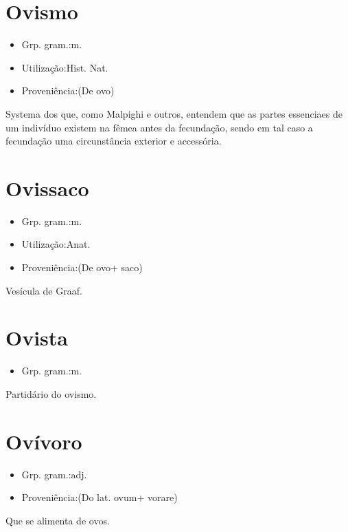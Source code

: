 \section{Ovismo}
\begin{itemize}
\item {Grp. gram.:m.}
\end{itemize}
\begin{itemize}
\item {Utilização:Hist. Nat.}
\end{itemize}
\begin{itemize}
\item {Proveniência:(De \textunderscore ovo\textunderscore )}
\end{itemize}
Systema dos que, como Malpighi e outros, entendem que as partes essenciaes de um indivíduo existem na fêmea antes da fecundação, sendo em tal caso a fecundação uma circunstância exterior e accessória.
\section{Ovissaco}
\begin{itemize}
\item {Grp. gram.:m.}
\end{itemize}
\begin{itemize}
\item {Utilização:Anat.}
\end{itemize}
\begin{itemize}
\item {Proveniência:(De \textunderscore ovo\textunderscore  + \textunderscore saco\textunderscore )}
\end{itemize}
Vesícula de Graaf.
\section{Ovista}
\begin{itemize}
\item {Grp. gram.:m.}
\end{itemize}
Partidário do ovismo.
\section{Ovívoro}
\begin{itemize}
\item {Grp. gram.:adj.}
\end{itemize}
\begin{itemize}
\item {Proveniência:(Do lat. \textunderscore ovum\textunderscore  + \textunderscore vorare\textunderscore )}
\end{itemize}
Que se alimenta de ovos.
